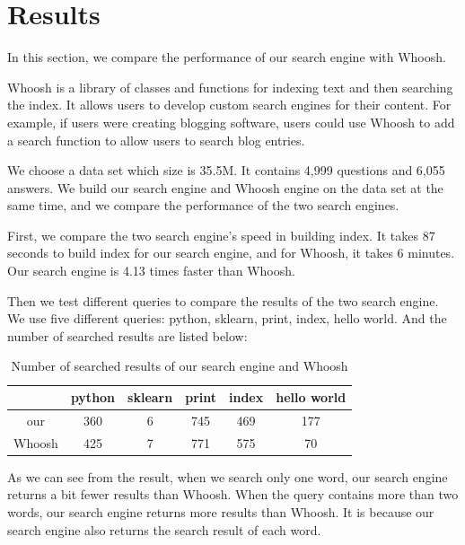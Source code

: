 \documentclass[10pt,journal,compsoc]{IEEEtran}
\begin{document}

\section{Results}
\label{sec:results}
In this section, we compare the performance of our search engine with Whoosh.

Whoosh is a library of classes and functions for indexing text and then searching the index. It allows users to develop custom search engines for their content. For example, if users were creating blogging software, users could use Whoosh to add a search function to allow users to search blog entries.

We choose a data set which size is 35.5M. It contains 4,999 questions and 6,055 answers. We build our search engine and Whoosh engine on the data set at the same time, and we compare the performance of the two search engines. 

First, we compare the two search engine's speed in building index. It takes 87 seconds to build index for our search engine, and for Whoosh, it takes 6 minutes. Our search engine is 4.13 times faster than Whoosh.

Then we test different queries to compare the results of the two search engine. We use five different queries: python, sklearn, print, index, hello world. And the number of searched results are listed below:

\begin{table}[H]
\centering
\caption{Number of searched results of our search engine and Whoosh}
\begin{tabular}{cccccc}
\toprule
      & python & sklearn & print & index & hello world \\
\midrule
our  & 360    & 6       & 745   & 469   & 177         \\
Whoosh & 425    & 7       & 771   & 575   & 70       \\  
\bottomrule
\end{tabular}
\end{table}

As we can see from the result, when we search only one word, our search engine returns a bit fewer results than Whoosh. When the query contains more than two words, our search engine returns more results than Whoosh. It is because our search engine also returns the search result of each word.
\end{document}
